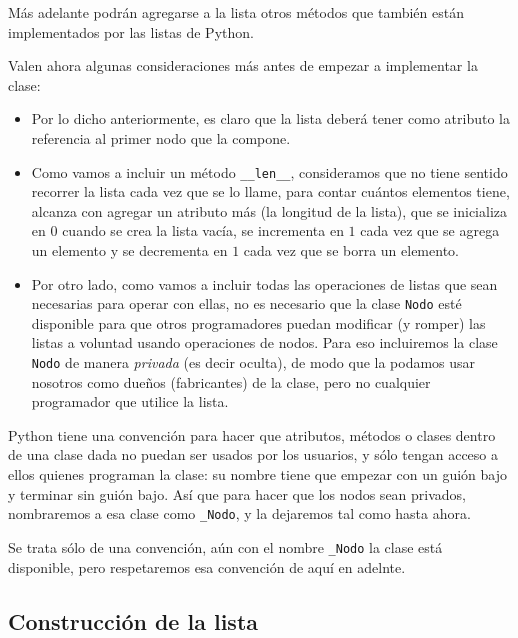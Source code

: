 Más adelante podrán agregarse a la lista otros métodos que también están
implementados por las listas de Python.

Valen ahora algunas consideraciones más antes de empezar a implementar la clase:

\begin{itemize}

\item Por lo dicho anteriormente, es claro que la lista deberá tener como
atributo la referencia al primer nodo que la compone.

\item Como vamos a incluir un método \lstinline|__len__|, consideramos que no
tiene sentido recorrer la lista cada vez que se lo llame, para contar
cuántos elementos tiene, alcanza con agregar un atributo más (la longitud
de la lista), que se inicializa en $0$ cuando se crea la lista vacía, se
incrementa en $1$ cada vez que se agrega un elemento y se decrementa en $1$
cada vez que se borra un elemento.

\item Por otro lado, como vamos a incluir todas las operaciones de listas
que sean necesarias para operar con ellas, no es necesario que la clase
\lstinline!Nodo! esté disponible para que otros programadores puedan
modificar (y romper) las listas a voluntad usando operaciones de nodos. Para eso
incluiremos la clase \lstinline!Nodo! de manera {\it privada} (es
decir oculta), de modo que la podamos usar nosotros como dueños
(fabricantes) de la clase, pero no cualquier programador que utilice la
lista.
\end{itemize}

Python tiene una convención para hacer que atributos, métodos o clases
dentro de una clase dada no puedan ser usados por los usuarios, y sólo
tengan acceso a ellos quienes programan la clase: su nombre tiene que
empezar con un guión bajo y terminar sin guión bajo. Así que para hacer que
los nodos sean privados, nombraremos a esa clase como \lstinline|_Nodo|, y
la dejaremos tal como hasta ahora.

\begin{observacion}
Se trata sólo de una convención, aún con el nombre \lstinline!_Nodo! la
clase está disponible, pero respetaremos esa convención de aquí en adelnte.
\end{observacion}

\subsection{Construcción de la lista}

